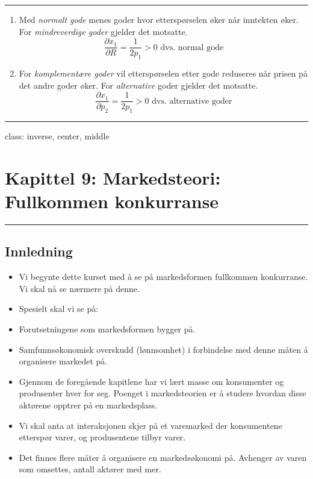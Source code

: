 \documentclass[
  letterpaper,
  DIV=11,
  numbers=noendperiod]{scrartcl}
\providecommand{\tightlist}{%
  \setlength{\itemsep}{0pt}\setlength{\parskip}{0pt}}\usepackage{longtable,booktabs,array}
\begin{document}
\begin{center}\rule{0.5\linewidth}{0.5pt}\end{center}

\begin{enumerate}
\def\labelenumi{\alph{enumi})}
\setcounter{enumi}{1}
\tightlist
\item
  Med \emph{normalt gode} menes goder hvor etterspørselen øker når
  inntekten øker. For \emph{mindreverdige goder} gjelder det motsatte.
  \begin{equation*}
  \frac{\partial  x_{1}}{\partial R} = \frac{1}{2p_1} > 0 \text{ dvs. normal gode}
  \end{equation*}
\item
  For \emph{komplementære goder} vil etterspørselen etter gode reduseres
  når prisen på det andre goder øker. For \emph{alternative} goder
  gjelder det motsatte. \begin{equation*}
  \frac{\partial  x_{1}}{\partial p_{2}} = \frac{1}{2p_1}  > 0 \text{ dvs. alternative goder}
  \end{equation*}
\end{enumerate}

\begin{center}\rule{0.5\linewidth}{0.5pt}\end{center}

class: inverse, center, middle

\section{Kapittel 9: Markedsteori: Fullkommen
konkurranse}\label{kapittel-9-markedsteori-fullkommen-konkurranse}

\begin{center}\rule{0.5\linewidth}{0.5pt}\end{center}

\subsection{Innledning}\label{innledning-3}

\begin{itemize}
\tightlist
\item
  Vi begynte dette kurset med å se på markedsformen fullkommen
  konkurranse. Vi skal nå se nærmere på denne.
\item
  Spesielt skal vi se på:
\item
  Forutsetningene som markedsformen bygger på.
\item
  Samfunnsøkonomisk overskudd (lønnsomhet) i forbindelse med denne måten
  å organisere markedet på.
\item
  Gjennom de foregående kapitlene har vi lært masse om konsumenter og
  produsenter hver for seg. Poenget i markedsteorien er å studere
  hvordan disse aktørene opptrer på en markedsplass.
\item
  Vi skal anta at interaksjonen skjer på et varemarked der konsumentene
  etterspør varer, og produsentene tilbyr varer.
\item
  Det finnes flere måter å organisere en markedsøkonomi på. Avhenger av
  varen som omsettes, antall aktører med mer.
\end{itemize}
\end{document}
